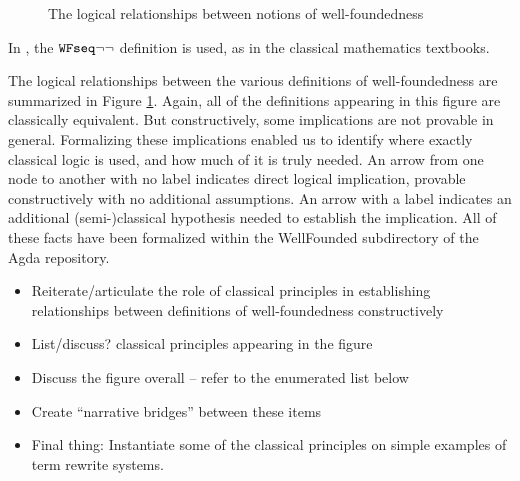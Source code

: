 \begin{figure}[hb]
\caption{The logical relationships between notions of well-foundedness}
 \label{fig:WF} 
\end{figure}
\clearpage

In \cite{Terese}, the $\mathtt{WFseq}{\lnot\lnot}$ definition is used, as in the classical mathematics textbooks.

The logical relationships between the various definitions of well-foundedness are summarized in 
Figure \ref{fig:WF}.
Again, all of the definitions appearing in this figure are classically equivalent.
But constructively, some implications are not provable in general.
Formalizing these implications enabled us to identify where exactly classical logic 
is used, and how much of it is truly needed.
An arrow from one node to another with no label indicates direct logical implication,
provable constructively with no additional assumptions. An arrow with a label indicates an additional 
(semi-)classical hypothesis needed to establish the implication. All of these facts have been 
formalized within the WellFounded subdirectory of the Agda repository.

\begin{itemize}
  \item Reiterate/articulate the role of classical principles in establishing relationships between definitions of 
    well-foundedness constructively 
  \item List/discuss? classical principles appearing in the figure 
  \item Discuss the figure overall -- refer to the enumerated list below 
  \item Create ``narrative bridges'' between these items 
  \item Final thing: Instantiate some of the classical principles on simple examples of term rewrite systems.
\end{itemize}


